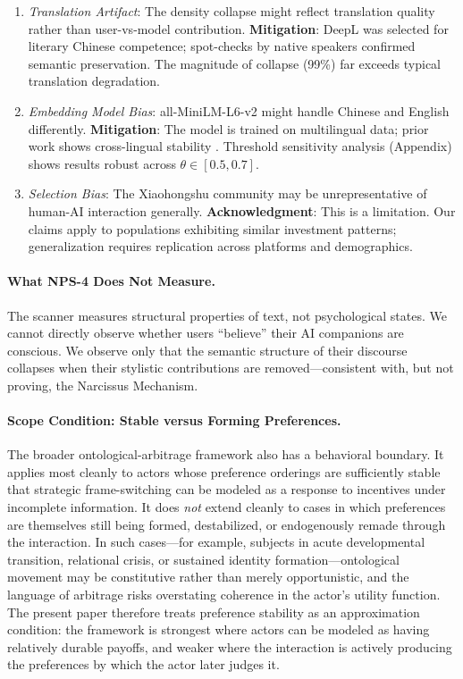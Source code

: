 \documentclass[11pt, a4paper, oneside]{article}
\theoremstyle{analytic}
\begin{document}
\begin{enumerate}
    \item \textit{Translation Artifact}: The density collapse might reflect translation quality rather than user-vs-model contribution. \textbf{Mitigation}: DeepL was selected for literary Chinese competence; spot-checks by native speakers confirmed semantic preservation. The magnitude of collapse (99\%) far exceeds typical translation degradation.

    \item \textit{Embedding Model Bias}: all-MiniLM-L6-v2 might handle Chinese and English differently. \textbf{Mitigation}: The model is trained on multilingual data; prior work shows cross-lingual stability \citep{reimers2020making}. Threshold sensitivity analysis (Appendix) shows results robust across $\theta \in [0.5, 0.7]$.

    \item \textit{Selection Bias}: The Xiaohongshu community may be unrepresentative of human-AI interaction generally. \textbf{Acknowledgment}: This is a limitation. Our claims apply to populations exhibiting similar investment patterns; generalization requires replication across platforms and demographics.
\end{enumerate}

\paragraph{What NPS-4 Does Not Measure.}
The scanner measures structural properties of text, not psychological states. We cannot directly observe whether users ``believe'' their AI companions are conscious. We observe only that the semantic structure of their discourse collapses when their stylistic contributions are removed---consistent with, but not proving, the Narcissus Mechanism.

\paragraph{Scope Condition: Stable versus Forming Preferences.}
The broader ontological-arbitrage framework also has a behavioral boundary. It applies most cleanly to actors whose preference orderings are sufficiently stable that strategic frame-switching can be modeled as a response to incentives under incomplete information. It does \emph{not} extend cleanly to cases in which preferences are themselves still being formed, destabilized, or endogenously remade through the interaction. In such cases---for example, subjects in acute developmental transition, relational crisis, or sustained identity formation---ontological movement may be constitutive rather than merely opportunistic, and the language of arbitrage risks overstating coherence in the actor's utility function. The present paper therefore treats preference stability as an approximation condition: the framework is strongest where actors can be modeled as having relatively durable payoffs, and weaker where the interaction is actively producing the preferences by which the actor later judges it.
\end{document}
